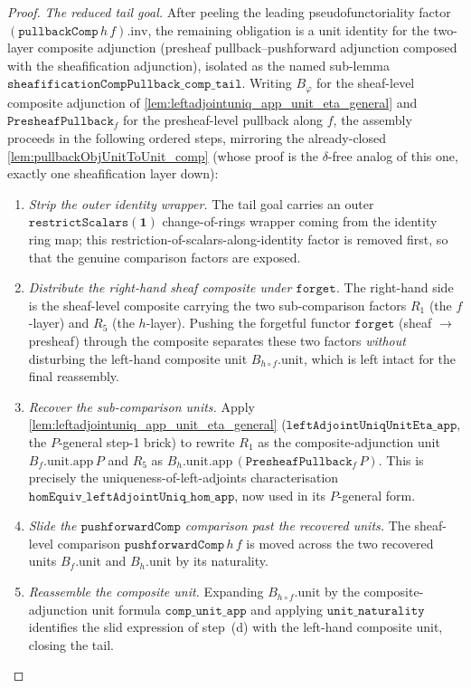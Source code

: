 \begin{proof}
  \emph{The reduced tail goal.} After peeling the leading pseudofunctoriality factor
  \((\mathtt{pullbackComp}\,h\,f).\mathrm{inv}\), the remaining obligation is a unit
  identity for the two-layer composite adjunction (presheaf pullback--pushforward adjunction
  composed with the sheafification adjunction), isolated as the named sub-lemma
  \(\mathtt{sheafificationCompPullback\_comp\_tail}\). Writing \(B_{\varphi}\) for the
  sheaf-level composite adjunction of \cref{lem:leftadjointuniq_app_unit_eta_general} and
  \(\mathtt{PresheafPullback}_f\) for the presheaf-level pullback along \(f\), the assembly
  proceeds in the following ordered steps, mirroring the already-closed
  \cref{lem:pullbackObjUnitToUnit_comp} (whose proof is the \(\delta\)-free analog of this one,
  exactly one sheafification layer down):
  \begin{enumerate}
    \item[(a)] \emph{Strip the outer identity wrapper.} The tail goal carries an outer
      \(\mathtt{restrictScalars}(\mathbf{1})\) change-of-rings wrapper coming from the
      identity ring map; this restriction-of-scalars-along-identity factor is removed first,
      so that the genuine comparison factors are exposed.
    \item[(b)] \emph{Distribute the right-hand sheaf composite under \(\mathtt{forget}\).} The
      right-hand side is the sheaf-level composite carrying the two sub-comparison factors
      \(R_1\) (the \(f\)-layer) and \(R_5\) (the \(h\)-layer). Pushing the forgetful functor
      \(\mathtt{forget}\) (sheaf \(\to\) presheaf) through the composite separates these two
      factors \emph{without} disturbing the left-hand composite unit \(B_{h\circ f}.\mathrm{unit}\),
      which is left intact for the final reassembly.
    \item[(c)] \emph{Recover the sub-comparison units.} Apply
      \cref{lem:leftadjointuniq_app_unit_eta_general}
      (\(\mathtt{leftAdjointUniqUnitEta\_app}\), the \(P\)-general step-1 brick) to rewrite
      \(R_1\) as the composite-adjunction unit \(B_f.\mathrm{unit}.\mathrm{app}\,P\) and
      \(R_5\) as \(B_h.\mathrm{unit}.\mathrm{app}\,(\mathtt{PresheafPullback}_f\,P)\). This is
      precisely the uniqueness-of-left-adjoints characterisation
      \(\mathtt{homEquiv\_leftAdjointUniq\_hom\_app}\), now used in its \(P\)-general form.
    \item[(d)] \emph{Slide the \(\mathtt{pushforwardComp}\) comparison past the recovered
      units.} The sheaf-level comparison \(\mathtt{pushforwardComp}\,h\,f\) is moved across the
      two recovered units \(B_f.\mathrm{unit}\) and \(B_h.\mathrm{unit}\) by its naturality.
    \item[(e)] \emph{Reassemble the composite unit.} Expanding
      \(B_{h\circ f}.\mathrm{unit}\) by the composite-adjunction unit formula
      \(\mathtt{comp\_unit\_app}\) and applying \(\mathtt{unit\_naturality}\) identifies the
      slid expression of step~(d) with the left-hand composite unit, closing the tail.
  \end{enumerate}


\end{proof}
